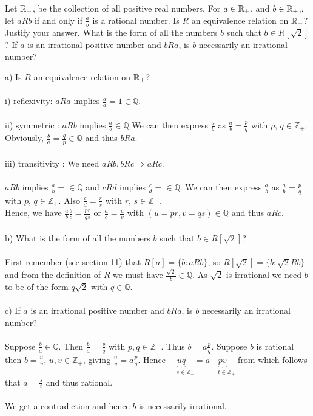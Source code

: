 \subsection{}
\begin{tcolorbox}
Let $\mathbb{R}_{+}$, be the collection of all positive real numbers. For $a \in \mathbb{R}_{+}$, and $b \in \mathbb{R}_{+} $,, let $a R b$ if and only if $\frac{a}{b}$ is a rational number. Is $R$ an equivalence relation on $\mathbb{R}_{+}$? Justify your answer. What is the form of all the numbers $b$ such that $b \in R[\sqrt{2}]$? If $a$ is an irrational positive number and $b R a$, is $b$ necessarily an irrational number? 
\end{tcolorbox}
$$ $$
a) Is $R$ an equivalence relation on $\mathbb{R}_{+}$?\\\\
i) reflexivity: $aRa$ implies $\frac{a}{a}=1\in \mathbb{Q}$.\\\\
ii) symmetric : $aRb$ implies $\frac{a}{b}\in \mathbb{Q}$ We can then express $\frac{a}{b}$ as $\frac{a}{b} =\frac{p}{q}$ with $p,\, q\in \mathbb{Z}_{+}$. Obviously, $\frac{b}{a} =\frac{q}{p}\in \mathbb{Q} $ and thus $bRa$.\\\\
iii) transitivity : We need $aRb, bRc\Rightarrow aRc$.\\\\
$aRb$ implies $\frac{a}{b}=\in \mathbb{Q}$ and  $cRd$ implies $\frac{c}{d}=\in \mathbb{Q}$. We can then express $\frac{a}{b}$ as $\frac{a}{b} =\frac{p}{q}$ with $p,\, q\in \mathbb{Z}_{+}$. Also $\frac{c}{d} =\frac{r}{s}$ with $r,\, s\in \mathbb{Z}_{+}$.\\
Hence, we have $\frac{a}{b}\frac{b}{c} = \frac{pr}{qs}$ or $\frac{a}{c}= \frac{u}{v}$ with $(u=pr,v=qs) \in \mathbb{Q} $ and thus $aRc$.\\\\
b) What is the form of all the numbers $b$ such that $b\in R[\sqrt{2}]$?\\\\
First remember (see section 11) that $R[a]=\{ b:aRb\}$, so $R[\sqrt{2}]=\{ b:\sqrt{2}Rb\}$ and from the definition of $R$  we must have $\frac{\sqrt{2}}{b}\in\mathbb{Q}$. As $\sqrt{2}$ is irrational we need $b$ to be of the form $q \sqrt{2}$ with $q\in \mathbb{Q}$.\\\\
c) If $a$ is an irrational positive number and $b R a$, is $b$ necessarily an irrational number? \\\\
Suppose $\frac{b}{a}\in \mathbb{Q}$. Then $\frac{b}{a}= \frac{p}{q}$ with $p,q \in \mathbb{Z}_{+}$. Thus $ b= a\frac{p}{q}$. Suppose $b$ is rational then $ b = \frac{u}{v}$, $u,v\in \mathbb{Z}_{+}$, giving $\frac{u}{v}=a\frac{p}{q}$. Hence $ \underbrace{uq}_{=s\in \mathbb{Z}_{+}}=a\underbrace{pv}_{=t\in \mathbb{Z}_{+}}$ from which follows that $a= \frac{s}{t}$ and thus rational.\\\\
 We get a contradiction and hence $b$ is necessarily irrational.

